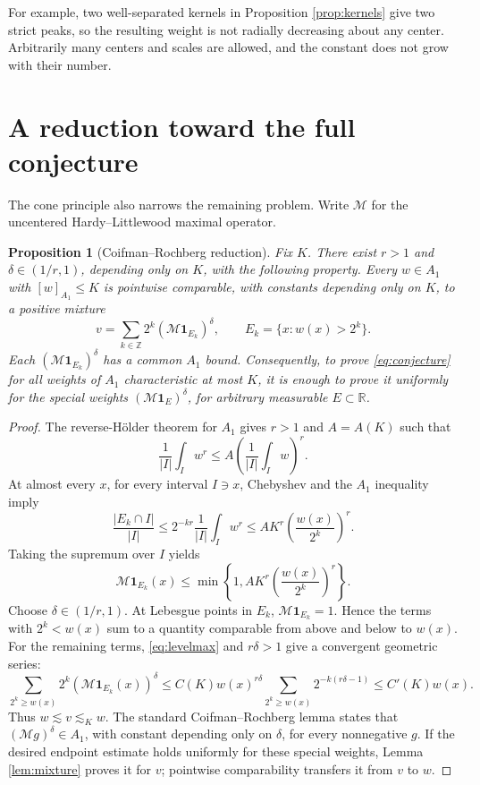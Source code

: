 \documentclass[11pt]{article}
\newtheorem{proposition}{Proposition}
\newcommand{\R}{\mathbb R}
\newcommand{\one}{\mathbf 1}
\newcommand{\M}{\mathcal M}
\begin{document}
For example, two well-separated kernels in Proposition \ref{prop:kernels}
give two strict peaks, so the resulting weight is not radially decreasing
about any center.  Arbitrarily many centers and scales are allowed, and the
constant does not grow with their number.

\section*{A reduction toward the full conjecture}

The cone principle also narrows the remaining problem.  Write \(\M\) for the
uncentered Hardy--Littlewood maximal operator.

\begin{proposition}[Coifman--Rochberg reduction]\label{prop:reduction}
Fix \(K\).  There exist \(r>1\) and \(\delta\in(1/r,1)\), depending only on
\(K\), with the following property.  Every \(w\in A_1\) with
\([w]_{A_1}\le K\) is pointwise comparable, with constants depending only on
\(K\), to a positive mixture
\[
 v=\sum_{k\in\mathbb Z}2^k(\M\one_{E_k})^\delta,
 \qquad E_k=\{x:w(x)>2^k\}.
\]
Each \((\M\one_{E_k})^\delta\) has a common \(A_1\) bound.  Consequently,
to prove \eqref{eq:conjecture} for all weights of \(A_1\) characteristic at
most \(K\), it is enough to prove it uniformly for the special weights
\((\M\one_E)^\delta\), for arbitrary measurable \(E\subset\R\).
\end{proposition}

\begin{proof}
The reverse-H\"older theorem for \(A_1\) gives \(r>1\) and \(A=A(K)\) such
that
\[
 \frac1{|I|}\int_Iw^r\le A\left(\frac1{|I|}\int_Iw\right)^r.
\]
At almost every \(x\), for every interval \(I\ni x\), Chebyshev and the
\(A_1\) inequality imply
\[
 \frac{|E_k\cap I|}{|I|}
 \le 2^{-kr}\frac1{|I|}\int_Iw^r
 \le A K^r\left(\frac{w(x)}{2^k}\right)^r.
\]
Taking the supremum over \(I\) yields
\begin{equation}\label{eq:levelmax}
 \M\one_{E_k}(x)
 \le \min\left\{1,AK^r\left(\frac{w(x)}{2^k}\right)^r\right\}.
\end{equation}
Choose \(\delta\in(1/r,1)\).  At Lebesgue points in \(E_k\),
\(\M\one_{E_k}=1\).  Hence the terms with \(2^k<w(x)\) sum to a quantity
comparable from above and below to \(w(x)\).  For the remaining terms,
\eqref{eq:levelmax} and \(r\delta>1\) give a convergent geometric series:
\[
 \sum_{2^k\ge w(x)}2^k(\M\one_{E_k}(x))^\delta
 \le C(K)w(x)^{r\delta}
 \sum_{2^k\ge w(x)}2^{-k(r\delta-1)}
 \le C'(K)w(x).
\]
Thus \(w\lesssim v\lesssim_Kw\).  The standard Coifman--Rochberg lemma
states that \((\M g)^\delta\in A_1\), with constant depending only on
\(\delta\), for every nonnegative \(g\).  If the desired endpoint estimate
holds uniformly for these special weights, Lemma \ref{lem:mixture} proves it
for \(v\); pointwise comparability transfers it from \(v\) to \(w\).
\end{proof}
\end{document}
